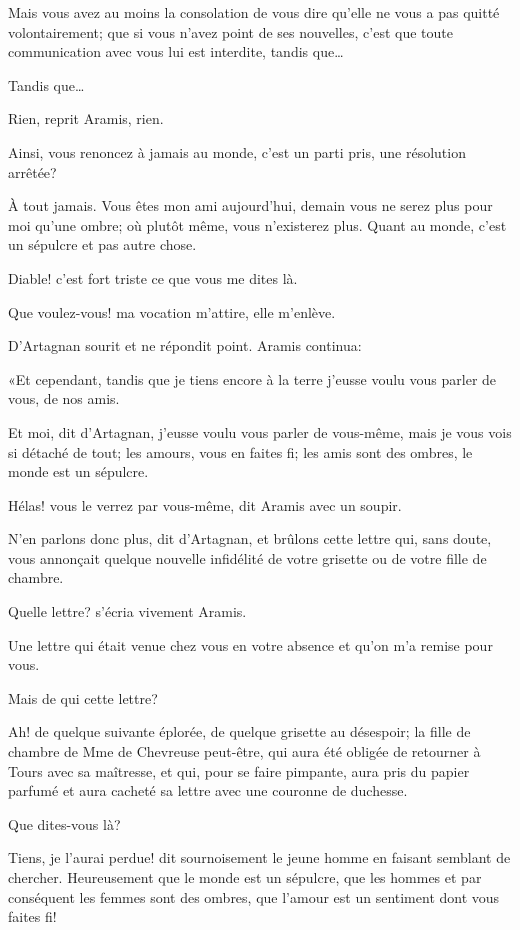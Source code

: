 \speak  Mais vous avez au moins la consolation de vous dire qu'elle ne vous a pas quitté volontairement; que si vous n'avez point de ses nouvelles, c'est que toute communication avec vous lui est interdite, tandis que\dots 

\speak  Tandis que\dots 

\speak  Rien, reprit Aramis, rien. 

\speak  Ainsi, vous renoncez à jamais au monde, c'est un parti pris, une résolution arrêtée? 

\speak  À tout jamais. Vous êtes mon ami aujourd'hui, demain vous ne serez plus pour moi qu'une ombre; où plutôt même, vous n'existerez plus. Quant au monde, c'est un sépulcre et pas autre chose. 

\speak  Diable! c'est fort triste ce que vous me dites là. 

\speak  Que voulez-vous! ma vocation m'attire, elle m'enlève. 

D'Artagnan sourit et ne répondit point. Aramis continua: 

«Et cependant, tandis que je tiens encore à la terre j'eusse voulu vous parler de vous, de nos amis. 

\speak  Et moi, dit d'Artagnan, j'eusse voulu vous parler de vous-même, mais je vous vois si détaché de tout; les amours, vous en faites fi; les amis sont des ombres, le monde est un sépulcre. 

\speak  Hélas! vous le verrez par vous-même, dit Aramis avec un soupir. 

\speak  N'en parlons donc plus, dit d'Artagnan, et brûlons cette lettre qui, sans doute, vous annonçait quelque nouvelle infidélité de votre grisette ou de votre fille de chambre. 

\speak  Quelle lettre? s'écria vivement Aramis. 

\speak  Une lettre qui était venue chez vous en votre absence et qu'on m'a remise pour vous. 

\speak  Mais de qui cette lettre? 

\speak  Ah! de quelque suivante éplorée, de quelque grisette au désespoir; la fille de chambre de Mme de Chevreuse peut-être, qui aura été obligée de retourner à Tours avec sa maîtresse, et qui, pour se faire pimpante, aura pris du papier parfumé et aura cacheté sa lettre avec une couronne de duchesse. 

\speak  Que dites-vous là? 

\speak  Tiens, je l'aurai perdue! dit sournoisement le jeune homme en faisant semblant de chercher. Heureusement que le monde est un sépulcre, que les hommes et par conséquent les femmes sont des ombres, que l'amour est un sentiment dont vous faites fi! 

